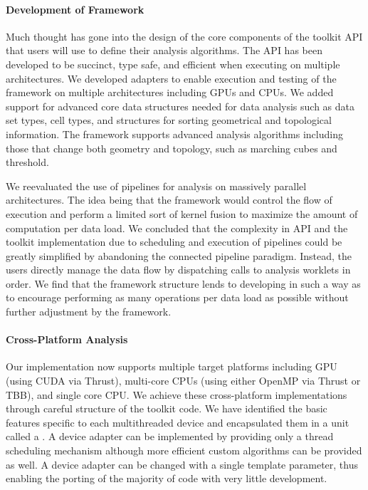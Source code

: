 \paragraph*{Development of Framework}

Much thought has gone into the design of the core components of the toolkit
API that users will use to define their analysis algorithms. The API has
been developed to be succinct, type safe, and efficient when executing on
multiple architectures. We developed adapters to enable execution and
testing of the framework on multiple architectures including GPUs and
CPUs. We added support for advanced core data structures needed for data
analysis such as data set types, cell types, and structures for sorting
geometrical and topological information. The framework supports advanced
analysis algorithms including those that change both geometry and topology,
such as marching cubes and threshold.
  
We reevaluated the use of pipelines for analysis on massively parallel
architectures. The idea being that the framework would control the flow of
execution and perform a limited sort of kernel fusion to maximize the
amount of computation per data load. We concluded that the complexity in
API and the toolkit implementation due to scheduling and execution of
pipelines could be greatly simplified by abandoning the connected pipeline
paradigm. Instead, the users directly manage the data flow by dispatching
calls to analysis worklets in order. We find that the framework structure
lends to developing in such a way as to encourage performing as many
operations per data load as possible without further adjustment by the
framework.

\paragraph*{Cross-Platform Analysis}

Our implementation now supports multiple target platforms including GPU
(using CUDA via Thrust), multi-core CPUs (using
either OpenMP via Thrust or TBB), and single core
CPU. We achieve these cross-platform implementations through careful
structure of the toolkit code. We have identified the basic features
specific to each multithreaded device and encapsulated them in a unit
called a . A device adapter
can be implemented by providing only a thread scheduling mechanism although
more efficient custom algorithms can be provided as well. A device adapter
can be changed with a single template parameter, thus enabling the porting
of the majority of code with very little development.


